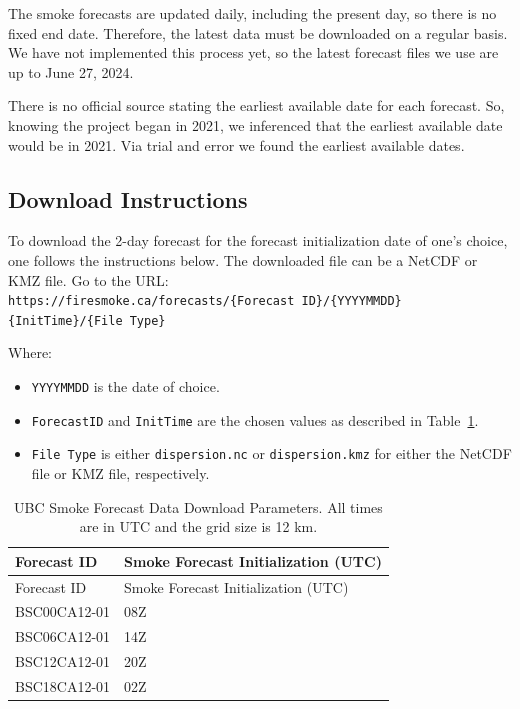 \documentclass[
  letterpaper,
  DIV=11,
  numbers=noendperiod]{scrreprt}
\providecommand{\tightlist}{%
  \setlength{\itemsep}{0pt}\setlength{\parskip}{0pt}}\usepackage{longtable,booktabs,array}
\begin{document}
The smoke forecasts are updated daily, including the present day, so
there is no fixed end date. Therefore, the latest data must be
downloaded on a regular basis. We have not implemented this process yet,
so the latest forecast files we use are up to June 27, 2024.

There is no official source stating the earliest available date for each
forecast. So, knowing the project began in 2021, we inferenced that the
earliest available date would be in 2021. Via trial and error we found
the earliest available dates.

\subsection{Download Instructions}\label{sec-download-instructions}

To download the 2-day forecast for the forecast initialization date of
one's choice, one follows the instructions below. The downloaded file
can be a NetCDF or KMZ file. Go to the URL:
\texttt{https://firesmoke.ca/forecasts/\{Forecast\ ID\}/\{YYYYMMDD\}\{InitTime\}/\{File\ Type\}}

Where:

\begin{itemize}
\tightlist
\item
  \texttt{YYYYMMDD} is the date of choice.
\item
  \texttt{ForecastID} and \texttt{InitTime} are the chosen values as
  described in Table~\ref{tbl-access}.
\item
  \texttt{File\ Type} is either \texttt{dispersion.nc} or
  \texttt{dispersion.kmz} for either the NetCDF file or KMZ file,
  respectively.
\end{itemize}

\begin{longtable}[]{@{}ll@{}}
\caption{UBC Smoke Forecast Data Download Parameters. All times are in
UTC and the grid size is 12 km.}\label{tbl-access}\tabularnewline
\toprule\noalign{}
Forecast ID & Smoke Forecast Initialization (UTC) \\
\midrule\noalign{}
\endfirsthead
\toprule\noalign{}
Forecast ID & Smoke Forecast Initialization (UTC) \\
\midrule\noalign{}
\endhead
\bottomrule\noalign{}
\endlastfoot
BSC00CA12-01 & 08Z \\
BSC06CA12-01 & 14Z \\
BSC12CA12-01 & 20Z \\
BSC18CA12-01 & 02Z \\
\end{longtable}
\end{document}
